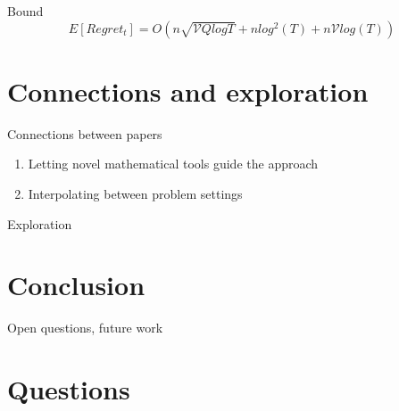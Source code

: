 \documentclass{beamer}
\begin{document}
\begin{frame}{Bound}
  \begin{equation}
    E[Regret_t] = O(n \sqrt{\mathcal{V}Q log T} + n log^2(T) + n \mathcal{V}log(T))
  \end{equation}
\end{frame}

\section{Connections and exploration}
\begin{frame}{Connections between papers}
  \begin{enumerate}
  \item
    Letting novel mathematical tools guide the approach
  \item 
    Interpolating between problem settings
  \end{enumerate}
\end{frame}

\begin{frame}{Exploration}
\end{frame}

\section{Conclusion}
\begin{frame}{Open questions, future work}
\end{frame}

\section{Questions}
\end{document}

